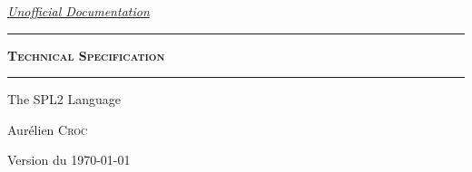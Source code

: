 \thispagestyle{empty}
\begin{center}
\underline{\emph{Unofficial Documentation}}
\vspace{3cm}

\rule{10cm}{0.1pt}
\vspace{0.3cm}

\begin{huge}\textbf{\textsc{Technical Specification}}\end{huge}
\rule{10cm}{0.1pt}
\vspace{4cm}

\begin{Huge}The SPL2 Language\end{Huge}
\vspace{8.5cm}

\begin{Large}Aurélien \textsc{Croc}\end{Large}

Version \version{} du \today{}

\end{center}
\newpage
